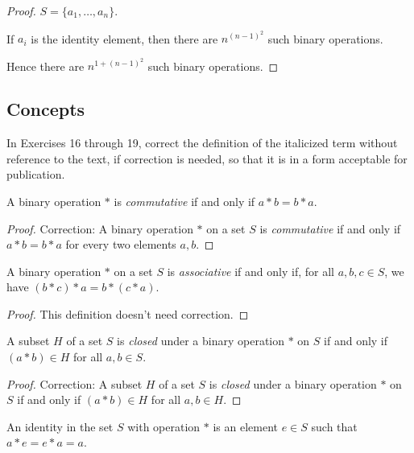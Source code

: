 \begin{proof}
    $S = \{ a_{1}, \ldots, a_{n} \}$.

    If $a_{i}$ is the identity element, then there are $n^{{(n-1)}^{2}}$ such binary operations.

    Hence there are $n^{1 + {(n-1)}^{2}}$ such binary operations.
\end{proof}

\subsection*{Concepts}

In Exercises 16 through 19, correct the definition of the italicized term without reference to the text, if correction is needed, so that it is in a form acceptable for publication.

\newpage
\begin{exercise}
    A binary operation $*$ is \textit{commutative} if and only if $a * b = b * a$.
\end{exercise}

\begin{proof}
    Correction: A binary operation $*$ on a set $S$ is \textit{commutative} if and only if $a * b = b * a$ for every two elements $a, b$.
\end{proof}

\newpage
\begin{exercise}
    A binary operation $*$ on a set $S$ is \textit{associative} if and only if, for all $a, b, c\in S$, we have $(b * c) * a = b * (c * a)$.
\end{exercise}

\begin{proof}
    This definition doesn't need correction.
\end{proof}

\newpage
\begin{exercise}
    A subset $H$ of a set $S$ is \textit{closed} under a binary operation $*$ on $S$ if and only if $(a * b)\in H$ for all $a, b\in S$.
\end{exercise}

\begin{proof}
    Correction: A subset $H$ of a set $S$ is \textit{closed} under a binary operation $*$ on $S$ if and only if $(a * b)\in H$ for all $a, b\in H$.
\end{proof}

\newpage
\begin{exercise}
    An identity in the set $S$ with operation $*$ is an element $e\in S$ such that $a * e = e * a = a$.
\end{exercise}

